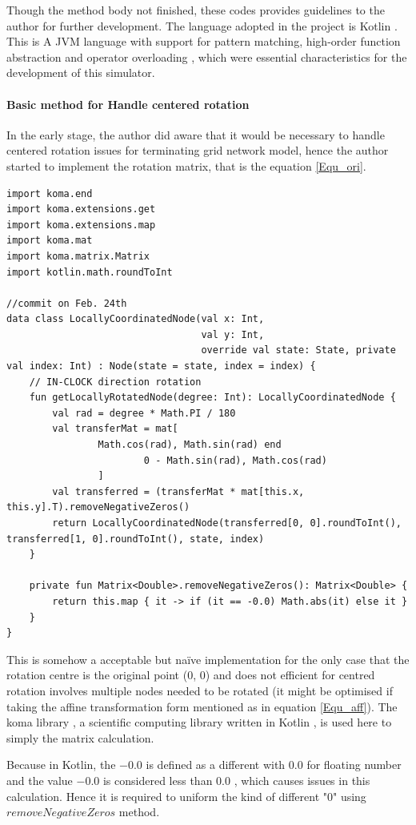 \par\noindent
Though the method body not finished, these codes provides guidelines to the author for further development.
The language adopted in the project is Kotlin \cite{Kotlin}. This is A JVM language with support for pattern matching, high-order
function abstraction and operator overloading \cite{Kotlin}, which were essential characteristics for the development of this simulator.

\paragraph{Basic method for Handle centered rotation}
In the early stage, the author did aware that it would be necessary to handle centered rotation issues for terminating grid network model, hence
the author started to implement the rotation matrix, that is the equation \ref{Equ_ori}.

\begin{lstlisting}[caption = {Grid network interface (early screenshot)}, style = mykotlin]
import koma.end
import koma.extensions.get
import koma.extensions.map
import koma.mat
import koma.matrix.Matrix
import kotlin.math.roundToInt

//commit on Feb. 24th
data class LocallyCoordinatedNode(val x: Int,
                                  val y: Int,
                                  override val state: State, private val index: Int) : Node(state = state, index = index) {
    // IN-CLOCK direction rotation
    fun getLocallyRotatedNode(degree: Int): LocallyCoordinatedNode {
        val rad = degree * Math.PI / 180
        val transferMat = mat[
                Math.cos(rad), Math.sin(rad) end
                        0 - Math.sin(rad), Math.cos(rad)
                ]
        val transferred = (transferMat * mat[this.x, this.y].T).removeNegativeZeros()
        return LocallyCoordinatedNode(transferred[0, 0].roundToInt(), transferred[1, 0].roundToInt(), state, index)
    }

    private fun Matrix<Double>.removeNegativeZeros(): Matrix<Double> {
        return this.map { it -> if (it == -0.0) Math.abs(it) else it }
    }
}
\end{lstlisting}

\par\noindent
This is somehow a acceptable but naïve implementation for the only case that the rotation centre is the original point (0, 0)
and does not efficient for centred rotation involves multiple nodes needed to be rotated
(it might be optimised if taking the affine transformation form mentioned as in equation \ref{Equ_aff}).
The koma library , a scientific computing library written in Kotlin \cite{Koma}, is used here to simply the matrix calculation.
\par\noindent
Because in Kotlin, the $-0.0$ is defined as a different with $0.0$ for floating number and the value $-0.0$ is considered less than $0.0$ \cite{Kotlinfloat},
which causes issues in this calculation. Hence it is required to uniform the kind of different "$0$" using $removeNegativeZeros$ method.


